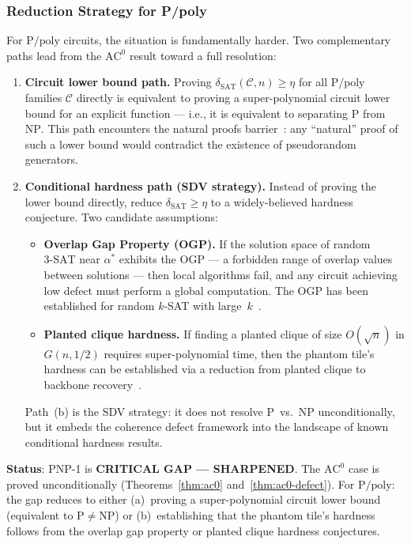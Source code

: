 \documentclass[11pt]{article}
\theoremstyle{definition}
\theoremstyle{remark}
\newcommand{\calC}{\mathcal{C}}
\newcommand{\Ppoly}{\mathrm{P/poly}}
\newcommand{\ACz}{\mathrm{AC}^0}
\newcommand{\threeSAT}{\mathrm{3\text{-}SAT}}
\newcommand{\dSAT}{\delta_{\mathrm{SAT}}}
\begin{document}
\subsubsection{Reduction Strategy for P/poly}

For $\Ppoly$ circuits, the situation is fundamentally harder.
Two complementary paths lead from the $\ACz$ result toward a full
resolution:

\begin{enumerate}[label=(\alph*)]
  \item \textbf{Circuit lower bound path.}  Proving $\dSAT(\calC, n) \geq \eta$
    for all $\Ppoly$ families $\calC$ directly is equivalent to proving a
    super-polynomial circuit lower bound for an explicit function ---
    i.e., it is equivalent to separating $\mathrm{P}$ from $\mathrm{NP}$.
    This path encounters the natural proofs barrier~\cite{RR}: any
    ``natural'' proof of such a lower bound would contradict the existence
    of pseudorandom generators.

  \item \textbf{Conditional hardness path (SDV strategy).}  Instead of
    proving the lower bound directly, reduce $\dSAT \geq \eta$ to a
    widely-believed hardness conjecture.  Two candidate assumptions:
    \begin{itemize}
      \item \textbf{Overlap Gap Property (OGP).}  If the solution space of
        random $\threeSAT$ near $\alpha^*$ exhibits the OGP --- a forbidden
        range of overlap values between solutions --- then local algorithms
        fail, and any circuit achieving low defect must perform a global
        computation.  The OGP has been established for random
        $k$-SAT with large~$k$~\cite{DSS15}.
      \item \textbf{Planted clique hardness.}  If finding a planted clique
        of size $O(\sqrt{n})$ in $G(n, 1/2)$ requires super-polynomial time,
        then the phantom tile's hardness can be established via a reduction
        from planted clique to backbone recovery~\cite{planted}.
    \end{itemize}
    Path~(b) is the SDV strategy: it does not resolve P~vs.~NP
    unconditionally, but it embeds the coherence defect framework into
    the landscape of known conditional hardness results.
\end{enumerate}

\textbf{Status}: PNP-1 is \textbf{CRITICAL GAP --- SHARPENED}.
The $\ACz$ case is proved unconditionally (Theorems~\ref{thm:ac0}
and~\ref{thm:ac0-defect}).  For $\Ppoly$: the gap reduces to either
(a)~proving a super-polynomial circuit lower bound (equivalent to
$\mathrm{P} \neq \mathrm{NP}$) or (b)~establishing that the phantom
tile's hardness follows from the overlap gap property or planted clique
hardness conjectures.
\end{document}
